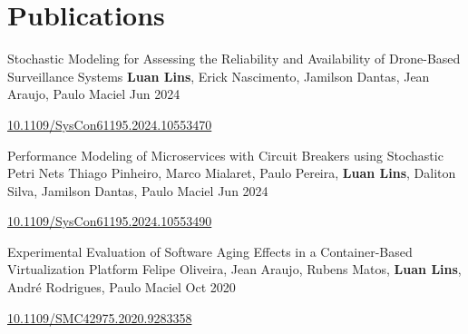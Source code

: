 \section{Publications}
    \resumeSubHeadingListStart

    \resumePubliSubheading
    {Stochastic Modeling for Assessing the Reliability and Availability of Drone-Based Surveillance Systems}
    {\textbf{Luan Lins}, Erick Nascimento, Jamilson Dantas, Jean Araujo, Paulo Maciel}
    {Jun 2024}
    
    \href{https://doi.org/10.1109/SysCon61195.2024.10553470}{10.1109/SysCon61195.2024.10553470}

    \resumePubliSubheading
    {Performance Modeling of Microservices with Circuit Breakers using Stochastic Petri Nets}
    {Thiago Pinheiro, Marco Mialaret, Paulo Pereira, \textbf{Luan Lins}, Daliton Silva, Jamilson Dantas, Paulo Maciel}
    {Jun 2024}
    
    \href{https://doi.org/10.1109/SysCon61195.2024.10553490}{10.1109/SysCon61195.2024.10553490}

    \resumePubliSubheading
    {Experimental Evaluation of Software Aging Effects in a Container-Based Virtualization Platform}
    {Felipe Oliveira, Jean Araujo, Rubens Matos, \textbf{Luan Lins}, André Rodrigues, Paulo Maciel}
    {Oct 2020}
    
    \href{https://doi.org/10.1109/SMC42975.2020.9283358}{10.1109/SMC42975.2020.9283358}

    \resumeSubHeadingListEnd
